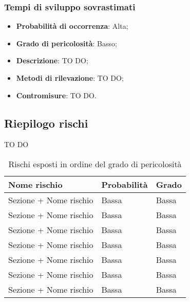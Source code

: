 		\subsubsection{Tempi di sviluppo sovrastimati} %
		\label{ssub:tempi_di_sviluppo_sovrastimati}
			\begin{itemize}
				\item \textbf{Probabilità di occorrenza}: Alta;
				\item \textbf{Grado di pericolosità}: Basso;
				\item \textbf{Descrizione}: TO DO;
				\item \textbf{Metodi di rilevazione}: TO DO;
				\item \textbf{Contromisure}: TO DO.
			\end{itemize}
		
	
	\subsection{Riepilogo rischi} %
	\label{sub:riepilogo_rischi}
	TO DO
		\begin{table}[!h]
			\begin{center}
				\begin{tabularx}{0.7\textwidth}{|l|X|X|}
					\hline
					\textbf{Nome rischio} & \textbf{Probabilità} & \textbf{Grado} \\
					\hline
					Sezione + Nome rischio &
					Bassa &
					Bassa \\
					\hline
					Sezione + Nome rischio &
					Bassa &
					Bassa \\
					\hline
					Sezione + Nome rischio &
					Bassa &
					Bassa \\
					\hline
					Sezione + Nome rischio &
					Bassa &
					Bassa \\
					\hline
					Sezione + Nome rischio &
					Bassa &
					Bassa \\
					\hline
					Sezione + Nome rischio &
					Bassa &
					Bassa \\
					\hline
					Sezione + Nome rischio &
					Bassa &
					Bassa \\
					\hline			
				\end{tabularx}
			\end{center}
		\caption{Rischi esposti in ordine del grado di pericolosità}
		\end{table}
		
	
